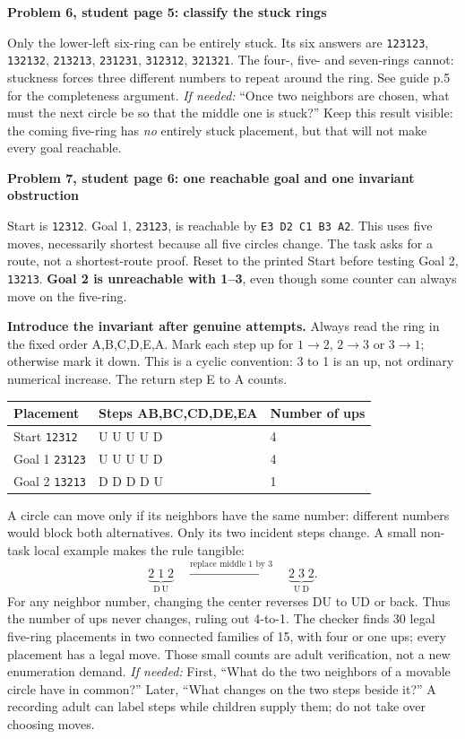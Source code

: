 \documentclass[10pt]{article}
\newcommand{\sub}[1]{\par\textbf{#1}\par}
\newcommand{\hint}[1]{\textit{If needed:} #1}
\newcommand{\word}[1]{\texttt{#1}}
\begin{document}
\sub{Problem 6, student page 5: classify the stuck rings}
Only the lower-left six-ring can be entirely stuck. Its six answers are \word{123123}, \word{132132}, \word{213213}, \word{231231}, \word{312312}, \word{321321}. The four-, five- and seven-rings cannot: stuckness forces three different numbers to repeat around the ring. See guide p.5 for the completeness argument. \hint{``Once two neighbors are chosen, what must the next circle be so that the middle one is stuck?''} Keep this result visible: the coming five-ring has \emph{no} entirely stuck placement, but that will not make every goal reachable.

\sub{Problem 7, student page 6: one reachable goal and one invariant obstruction}
Start is \word{12312}. Goal 1, \word{23123}, is reachable by \word{E3 D2 C1 B3 A2}. This uses five moves, necessarily shortest because all five circles change. The task asks for a route, not a shortest-route proof. Reset to the printed Start before testing Goal 2, \word{13213}. \textbf{Goal 2 is unreachable with 1--3}, even though some counter can always move on the five-ring.

\textbf{Introduce the invariant after genuine attempts.} Always read the ring in the fixed order A,B,C,D,E,A. Mark each step up for $1\to2$, $2\to3$ or $3\to1$; otherwise mark it down. This is a cyclic convention: 3 to 1 is an up, not ordinary numerical increase. The return step E to A counts.
\begin{center}\renewcommand{\arraystretch}{1.25}
\begin{tabular}{lll}
Placement & Steps AB,BC,CD,DE,EA & Number of ups\\\midrule
Start \word{12312} & U U U U D & 4\\
Goal 1 \word{23123} & U U U U D & 4\\
Goal 2 \word{13213} & D D D D U & 1\\
\end{tabular}\end{center}
A circle can move only if its neighbors have the same number: different numbers would block both alternatives. Only its two incident steps change. A small non-task local example makes the rule tangible:
\[
\underbrace{2\;1\;2}_{\mathrm{D\ U}}\quad
\xrightarrow{\text{replace middle 1 by 3}}\quad
\underbrace{2\;3\;2}_{\mathrm{U\ D}}.
\]
For any neighbor number, changing the center reverses DU to UD or back. Thus the number of ups never changes, ruling out 4-to-1. The checker finds 30 legal five-ring placements in two connected families of 15, with four or one ups; every placement has a legal move. Those small counts are adult verification, not a new enumeration demand. \hint{First, ``What do the two neighbors of a movable circle have in common?'' Later, ``What changes on the two steps beside it?''} A recording adult can label steps while children supply them; do not take over choosing moves.
\end{document}
